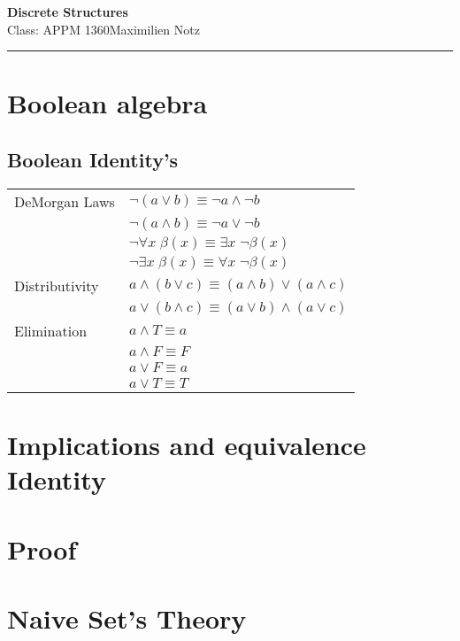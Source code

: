 \documentclass[5pt]{article}
\begin{document}
\begin{center}
     \Large{\textbf{Discrete Structures}}\\
     \small{Class: APPM 1360}\hfill\small{\textcopyright Maximilien Notz \the\year{}}
     \noindent\rule{20.2cm}{0.4pt}
\end{center}


\begin{multicols}{2}
\setcounter{secnumdepth}{0}


\section{Boolean algebra}
\subsection{Boolean Identity's}
\begin{tabular}{ll}
    DeMorgan Laws    & $\lnot(a\lor b)\equiv \lnot a\land\lnot b$\\
                     & $\lnot(a\land b)\equiv \lnot a\lor\lnot b$\\
                     & $\lnot\forall x\;\beta(x)\equiv\exists x\;\lnot\beta(x) $\\
                     & $\lnot\exists x\;\beta(x)\equiv\forall x\;\lnot\beta(x) $\\
    Distributivity   & $a\land(b\lor c)\equiv(a\land b)\lor(a\land c)$\\
                     & $a\lor(b\land c)\equiv(a\lor b)\land(a\lor c)$\\
    Elimination      & $a\land T\equiv a$\\
                     & $a\land F\equiv F$\\
                     & $a\lor F\equiv a$\\
                     & $a\lor T\equiv T$\\
\end{tabular}

\section{Implications and equivalence Identity}

\section{Proof}

\section{Naive Set's Theory}

\end{multicols}
\end{document}
